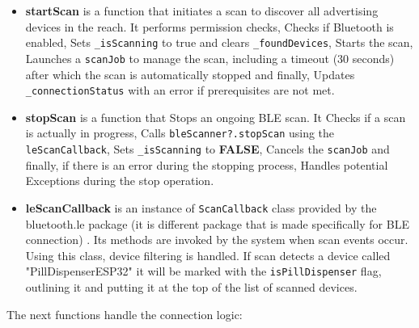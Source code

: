 \begin{itemize}
	\item \textbf{startScan} is a function that initiates a scan to discover all advertising devices in the reach. It performs permission checks,  Checks if Bluetooth is enabled, Sets \texttt{\_isScanning} to true and clears \texttt{\_foundDevices}, Starts the scan, Launches a \texttt{scanJob} to manage the scan, including a timeout (30 seconds) after which the scan is automatically stopped and finally, Updates \texttt{\_connectionStatus} with an error if prerequisites are not met.
	\item \textbf{stopScan} is a function that Stops an ongoing BLE scan. It Checks if a scan is actually in progress, Calls \texttt{bleScanner?.stopScan} using the \texttt{leScanCallback}, Sets \texttt{\_isScanning} to \textbf{FALSE}, Cancels the \texttt{scanJob} and finally, if there is an error during the stopping process, Handles potential Exceptions during the stop operation. 
	\item \textbf{leScanCallback} is an instance of \texttt{ScanCallback} class provided by the bluetooth.le package (it is different package that is made specifically for \ac{BLE} connection) \cite{android_bluetooth_le}. Its methods are invoked by the system when scan events occur. Using this class, device filtering is handled. If scan detects a device called "PillDispenserESP32" it will be marked with the \texttt{isPillDispenser} flag, outlining it and putting it at the top of the list of scanned devices.
\end{itemize}
The next functions handle the connection logic:
